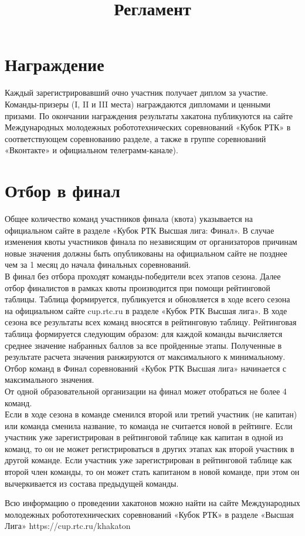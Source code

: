 \documentclass[12pt]{article}
\begin{document}
\section{Награждение} \hspace*{1cm}
Каждый зарегистрировавший очно участник получает диплом за участие. Команды-призеры (I, II и III места) награждаются дипломами и ценными призами. По окончании награждения результаты хакатона публикуются на сайте Международных молодежных робототехнических соревнований «Кубок РТК» в соответствующем соревнованию разделе, а также в группе соревнований «Вконтакте» и официальном телеграмм-канале).

\section{Отбор в финал} \hspace*{1cm}
Общее количество команд участников финала (квота) указывается на официальном сайте в разделе «Кубок РТК Высшая лига: Финал». В случае изменения квоты участников финала по независящим от организаторов причинам новые значения должны быть опубликованы на официальном сайте не позднее чем за 1 месяц до начала финальных соревнований.
\\\hspace*{1cm}В финал без отбора проходят команды-победители всех этапов сезона. Далее отбор финалистов в рамках квоты производится при помощи рейтинговой таблицы. Таблица формируется, публикуется и обновляется в ходе всего сезона на официальном сайте cup.rtc.ru в разделе «Кубок РТК Высшая лига». В ходе сезона все результаты всех команд вносятся в рейтинговую таблицу. Рейтинговая таблица формируется следующим образом: для каждой команды вычисляется среднее значение набранных баллов за все пройденные этапы. Полученные в результате расчета значения ранжируются от максимального к минимальному. Отбор команд в Финал соревнований «Кубок РТК Высшая лига» начинается с максимального значения.
\\\hspace*{1cm}От одной образовательной организации на финал может отобраться не более 
4 команд.
\\\hspace*{1cm}Если в ходе сезона в команде сменился второй или третий участник (не капитан) или команда сменила название, то команда не считается новой в рейтинге. Если участник уже зарегистрирован в рейтинговой таблице как капитан в одной из команд, то он не может регистрироваться в других этапах как второй участник в другой команде. Если участник уже зарегистрирован в рейтинговой таблице как второй член команды, то он может стать капитаном в новой команде, при этом он вычеркивается из состава предыдущей команды.

\newpage
\title{Регламент}
Всю информацию о проведении хакатонов можно найти на сайте Международных молодежных робототехнических соревнований «Кубок РТК» в разделе «Высшая Лига» https://cup.rtc.ru/khakaton
\end{document}
